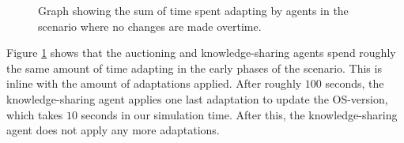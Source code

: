 \begin{figure}[H]
    \centering
        
    \caption{Graph showing the sum of time spent adapting by agents in the scenario where no changes are made overtime.}
    \label{fig:adapting-time-no-change}
\end{figure}

Figure \ref{fig:adapting-time-no-change} shows that the auctioning and knowledge-sharing agents spend roughly the same amount of time adapting in the early phases of the scenario. This is inline with the amount of adaptations applied. After roughly $100$ seconds, the knowledge-sharing agent applies one last adaptation to update the OS-version, which takes $10$ seconds in our simulation time. After this, the knowledge-sharing agent does not apply any more adaptations.
